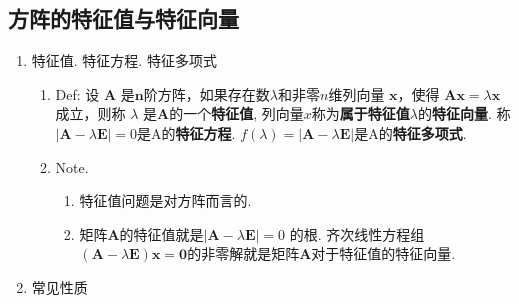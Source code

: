 \subsection{方阵的特征值与特征向量}
\begin{enumerate}
\item 特征值. 特征方程. 特征多项式
\begin{enumerate}
\item Def: 设 $\boldsymbol{A}$ 是$\boldsymbol{n}$阶方阵，如果存在数$\lambda$和非零$n$维列向量
$\boldsymbol{x}$，使得 $\boldsymbol{A}\boldsymbol{x}=\lambda\boldsymbol{x}$
成立，则称 $\lambda$ 是$\boldsymbol{A}$的一个\textbf{特征值}, 列向量$x$称为\textbf{属于特征值}$\lambda$的\textbf{特征向量}.
称$|\boldsymbol{A}-\lambda\boldsymbol{E}|=0$是A的\textbf{特征方程}. $f(\lambda)=|\boldsymbol{A}-\lambda\boldsymbol{E}|$是A的\textbf{特征多项式}. 
\item Note. 
\begin{enumerate}
\item 特征值问题是对方阵而言的. 
\item 矩阵$\boldsymbol{A}$的特征值就是$|\boldsymbol{A}-\lambda\boldsymbol{E}|=0$
的根. 齐次线性方程组$(\boldsymbol{A}-\lambda\boldsymbol{E})\boldsymbol{x}=\boldsymbol{0}$的非零解就是矩阵$\boldsymbol{A}$对于特征值的特征向量. 
\end{enumerate}
\end{enumerate}
\item 常见性质


\end{enumerate}
